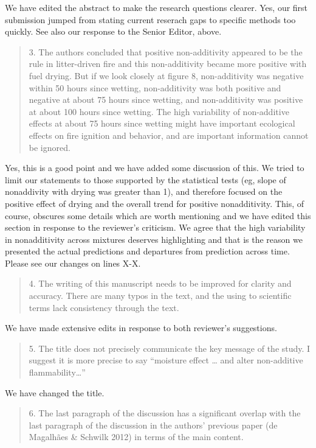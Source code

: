 \documentclass[letterpaper, 12pt]{letter}
\begin{document}
\begin{letter}{}
We have edited the abstract to make the research questions clearer. Yes, our
first submission jumped from stating current reserach gaps to specific methods
too quickly. See also our response to the Senior Editor, above.


\begin{quote}
3. The authors concluded that positive non-additivity appeared to be the rule in litter-driven fire and this non-additivity became more positive with fuel drying. But if we look closely at figure 8, non-additivity was negative within 50 hours since wetting, non-additivity was both positive and negative at about 75 hours since wetting, and non-additivity was positive at about 100 hours since wetting. The high variability of non-additive effects at about 75 hours since wetting might have important ecological effects on fire ignition and behavior, and are important information cannot be ignored.
\end{quote}

Yes, this is a good point and we have added some discussion of this. We tried to limit our statements to those supported by the statistical tests (eg, slope of nonaddivity with drying was greater than 1), and therefore focused on the positive effect of drying and the overall trend for positive nonadditivity. This, of course, obscures some details which are worth mentioning and we have edited this section in response to the reviewer's criticism. We agree that the high variability in nonadditivity across mixtures deserves highlighting and that is the reason we presented the actual predictions and departures from prediction across time. Please see our changes on lines X-X.


\begin{quote}
4. The writing of this manuscript needs to be improved for clarity and accuracy. There are many typos in the text, and the using to scientific terms lack consistency through the text.
\end{quote}

We have made extensive edits in response to both reviewer's suggestions.

\begin{quote}
5. The title does not precisely communicate the key message of the study. I suggest it is more precise to say “moisture effect … and alter non-additive flammability…”
\end{quote}

We have changed the title.

\begin{quote}
6. The last paragraph of the discussion has a significant overlap with the last paragraph of the discussion in the authors’ previous paper (de Magalhães \& Schwilk 2012) in terms of the main content.
\end{quote}



\end{letter}
\end{document}
